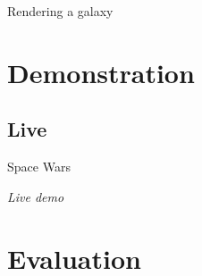 \documentclass{beamer}
\begin{document}
\begin{frame}{Rendering a galaxy}
\begin{center}
\noindent{}
\end{center}
\end{frame}
\section{Demonstration}
\subsection{Live}
\begin{frame}{Space Wars}
\begin{center}
\emph{Live demo}
\end{center}
\end{frame}
\section{Evaluation}
\end{document}
